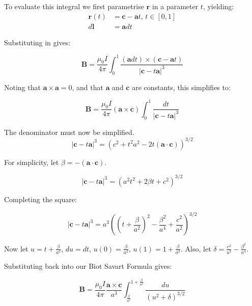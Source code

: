To evaluate this integral we first parametrise $\mathbf{r}$ in a parameter $t$, yielding:
\begin{align*}
  \mathbf{r}(t) &= \mathbf{c} - \mathbf{a}t \text{, } t \in [0,1] \\
  d\mathbf{l} &= \mathbf{a}dt
\end{align*}

Substituting in gives:

\begin{equation}
  \mathbf{B} = \frac{\mu_0 I}{4\pi} \int_{0}^{1} \frac{(\mathbf{a}dt)\times (\mathbf{c} - \mathbf{a}t)}{\left \vert \mathbf{c} -  t\mathbf{a}\right\vert^3}
\end{equation}

Noting that $\mathbf{a} \times \mathbf{a} = 0$, and that $\mathbf{a}$ and $\mathbf{c}$ are constants, this simplifies to:

\begin{equation} 
  \mathbf{B} = \frac{\mu_0 I}{4\pi}(\mathbf{a} \times \mathbf{c}) \int_{0}^{1}  \frac{dt}{\left \vert \mathbf{c} -  t\mathbf{a}\right\vert^3}
\end{equation}

The denominator must now be simplified.
\begin{equation}
  \left\vert \mathbf{c} - t\mathbf{a} \right \vert ^3 = \left( c^2 + t^2a^2 - 2t(\mathbf{a}\cdot \mathbf{c}) \right)^{3/2}
\end{equation}

For simplicity, let $\beta = -(\mathbf{a} \cdot \mathbf{c})$.

\begin{equation}
  \left\vert \mathbf{c} - t\mathbf{a} \right \vert ^3 =  \left( a^2t^2 + 2\beta t + c^2  \right)^{3/2}
\end{equation}

Completing the square:

\begin{equation}
  \left\vert \mathbf{c} - t\mathbf{a} \right \vert ^3 =  a^{3} \left( \left ( t + \frac{\beta}{a^2} \right)^2 -\frac{\beta^2}{a^4} + \frac{c^2}{a^2} \right)^{3/2}
\end{equation}

Now let $u = t + \frac{\beta}{a^2}$, $du = dt$, $u(0) = \frac{\beta}{a^2}$, $u(1) = 1 + \frac{\beta}{a^2}$. Also, let $\delta = \frac{c^2}{a^2} - \frac{\beta^2}{a^4}$.

Substituting back into our Biot Savart Formula gives:

\begin{equation}
  \mathbf{B} = \frac{\mu_0 I}{4\pi} \frac{\mathbf{a} \times \mathbf{c}}{a^3} \int_{\frac{\beta}{a^2}}^{1+\frac{\beta}{a^2}} \frac{du}{\left(u^2 + \delta\right)^{3/2}}
\end{equation}

